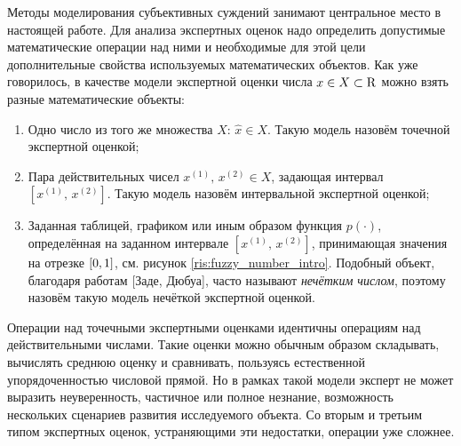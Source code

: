 
\label{sec:math_methods_global}


Методы моделирования субъективных суждений занимают центральное место в настоящей работе. Для анализа экспертных оценок надо определить допустимые математические операции над ними и необходимые для этой цели дополнительные свойства используемых математических объектов. Как уже говорилось, в качестве модели экспертной оценки числа $x \in X \subset {\mathrm{R}}$ можно взять разные математические объекты: %
\begin{enumerate}
  \item Одно число из того же множества $X$: $\hat{x} \in X$. Такую модель назовём точечной экспертной оценкой;
  \item Пара действительных чисел $x^{(1)},\, x^{(2)} \in X$, задающая интервал $[x^{(1)},\, x^{(2)}]$. Такую модель назовём интервальной экспертной оценкой;
  \item Заданная таблицей, графиком или иным образом функция $p(\cdot)$, определённая на заданном интервале $[x^{(1)},\, x^{(2)}]$, принимающая значения на отрезке $[0,1]$, см. рисунок \ref{ris:fuzzy_number_intro}.  Подобный объект, благодаря работам [Заде, Дюбуа], часто называют {\sl нечётким числом}, поэтому назовём такую модель нечёткой экспертной оценкой. 
\end{enumerate}

Операции над точечными экспертными оценками идентичны операциям над действительными числами. Такие оценки можно обычным образом складывать, вычислять среднюю оценку и сравнивать, пользуясь естественной упорядоченностью числовой прямой. Но в рамках такой модели эксперт не может выразить неуверенность, частичное или полное незнание, возможность нескольких сценариев развития исследуемого объекта. Со вторым и третьим типом экспертных оценок, устраняющими эти недостатки, операции уже сложнее.

